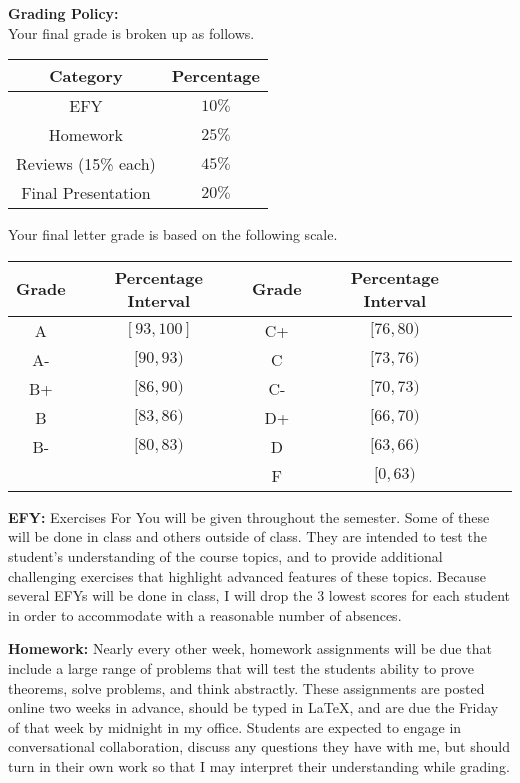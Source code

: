 \documentclass[11pt, a4paper]{article}
\begin{document}
\noindent\textbf{Grading Policy:}~\\
Your final grade is broken up as follows. 
\begin{center}
\begin{tabular}{|cc|}
  \hline
  Category & Percentage\\
  \hline
  EFY & $10\%$\\
  Homework & $25\%$\\
  Reviews (15\% each) & $45\%$\\
  Final Presentation & $20\%$\\
  \hline
\end{tabular}
\end{center}

\newpage
Your final letter grade is based on the following scale.
\begin{center}
\begin{tabular}{|cc | cc | cc|}
  \hline
  Grade & Percentage Interval & Grade & Percentage Interval\\
  \hline
  A & $[93,100]$ & C+ & $[76,80)$\\
  A- & $[90,93)$ & C & $[73,76)$ \\
  B+ & $[86,90)$ & C- & $[70,73)$\\
  B & $[83,86)$ & D+ & $[66,70)$\\
  B- & $[80,83)$ & D & $[63,66)$\\
     &           & F & $[0,63)$\\
  \hline
\end{tabular}
\end{center}

\vspace*{0.5em}
\noindent\textbf{EFY:}
Exercises For You will be given throughout the semester. Some of these will be done in class and others outside of class. They are intended to test the student's understanding of the course topics, and to provide additional challenging exercises that highlight advanced features of these topics. Because several EFYs will be done in class, I will drop the 3 lowest scores for each student in order to accommodate with a reasonable number of absences. 

\vspace*{0.5em}
\noindent\textbf{Homework:}
Nearly every other week, homework assignments will be due that include a large range of problems that will test the students ability to prove theorems, solve problems, and think abstractly. These assignments are posted online two weeks in advance, should be typed in LaTeX, and are due the Friday of that week by midnight in my office.  Students are expected to engage in conversational collaboration, discuss any questions they have with me, but should turn in their own work so that I may interpret their understanding while grading. 
\end{document}
